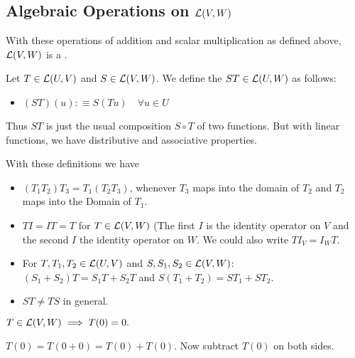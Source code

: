 \subsection{Algebraic Operations on \texorpdfstring{$\mathcal{L}(V,W)$}{L(V,W)}}
\setcounter{thm}{5}
\begin{thm} [$\lvw$]
  With these operations of addition and scalar multiplication as defined above, $\lvw$ is a \vs.
\end{thm}

\setcounter{thm}{6}
\begin{mydef}
  Let $T \in {\mathcal{L}(U, V)}$ and $S \in {\mathcal{L}(V, W)}$. We define the  $ST \in {\mathcal{L}(U, W)}$ as follows:
  \begin{itemize}
    \item[] $(ST)(u) :\equiv S(Tu) \quad \forall u \in U$
  \end{itemize}
  Thus $ST$ is just the usual composition  $S \circ T$ of two functions. But with linear functions, we have distributive and associative properties.
\end{mydef}

\begin{thm} 
  With these definitions we have
  \begin{itemize}
    \item {} $(T_1 T_2) T_3 = T_1 (T_2 T_3)$, whenever $T_3$ maps into the domain of $T_2$ and $T_2$ maps into the Domain of $T_1$.
    \item {} $T I = I T = T$ for $T \in {\mathcal{L}(V,W)}$ (The first $I$ is the identity operator on $V$ and the second $I$ the identity operator on $W$.
    We could also write $T I_V = I_W T$.
    \item {} For $T, T_1, T_2 \in {\mathcal{L}(U, V)}$ and $S, S_1, S_2 \in {\mathcal{L}(V, W)}$: \\ $(S_1 + S_2)T=S_1 T + S_2 T$ and $S(T_1 + T_2)=S T_1 + S T_2$.
    \item {} $ST \neq TS$ in general.
  \end{itemize}
\end{thm}

\setcounter{thm}{9}
\begin{thm} 
  \label{thm: linear maps take 0 to 0}
  $T\in {\mathcal{L}(V,W)} \implies T(0)=0.$
\end{thm}
\begin{prf}
  $T(0) = T(0+0) = T(0) + T(0)$. Now subtract $T(0)$ on both sides.
\end{prf}